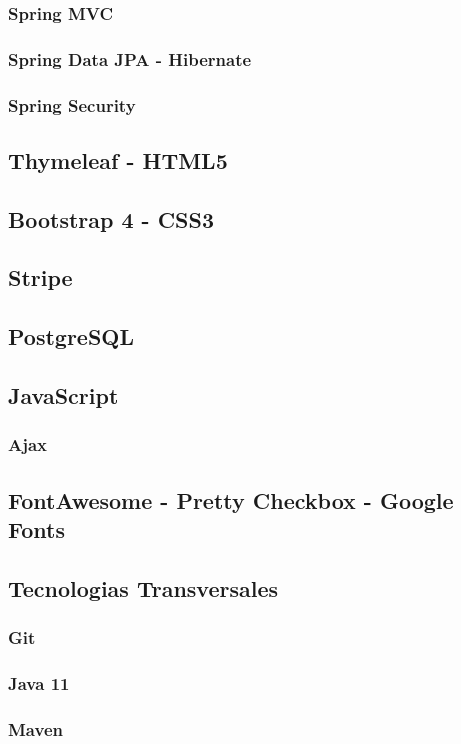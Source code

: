 \documentclass[a4paper]{report}
\begin{document}
    \subsubsection{Spring MVC}
    \subsubsection{Spring Data JPA - Hibernate}
    \subsubsection{Spring Security}
    \subsection{Thymeleaf - HTML5}
    \subsection{Bootstrap 4 - CSS3}
    \subsection{Stripe}
    \subsection{PostgreSQL}
    \subsection{JavaScript}
    \subsubsection{Ajax}
    \subsection{FontAwesome - Pretty Checkbox - Google Fonts}
    \subsection{Tecnologias Transversales}
    \subsubsection{Git}
    \subsubsection{Java 11}
    \subsubsection{Maven}
\end{document}
